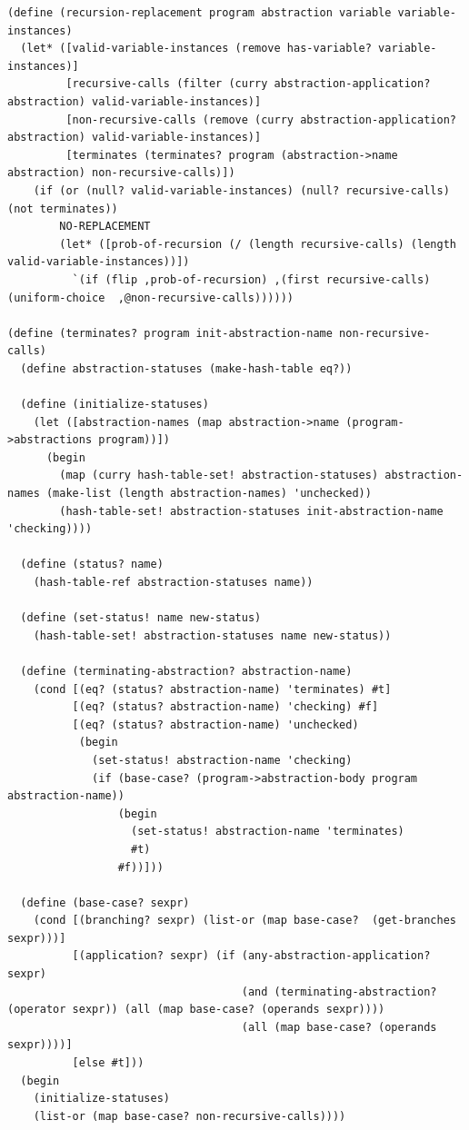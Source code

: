 \documentclass[a4paper,10pt]{article}
\begin{document}
\begin{lstlisting}[frame=trBL]
(define (recursion-replacement program abstraction variable variable-instances)
  (let* ([valid-variable-instances (remove has-variable? variable-instances)]
         [recursive-calls (filter (curry abstraction-application? abstraction) valid-variable-instances)]
         [non-recursive-calls (remove (curry abstraction-application? abstraction) valid-variable-instances)]
         [terminates (terminates? program (abstraction->name abstraction) non-recursive-calls)]) 
    (if (or (null? valid-variable-instances) (null? recursive-calls) (not terminates))
        NO-REPLACEMENT
        (let* ([prob-of-recursion (/ (length recursive-calls) (length valid-variable-instances))])
          `(if (flip ,prob-of-recursion) ,(first recursive-calls) (uniform-choice  ,@non-recursive-calls))))))

(define (terminates? program init-abstraction-name non-recursive-calls)
  (define abstraction-statuses (make-hash-table eq?))

  (define (initialize-statuses)
    (let ([abstraction-names (map abstraction->name (program->abstractions program))])
      (begin
        (map (curry hash-table-set! abstraction-statuses) abstraction-names (make-list (length abstraction-names) 'unchecked))
        (hash-table-set! abstraction-statuses init-abstraction-name 'checking))))

  (define (status? name)
    (hash-table-ref abstraction-statuses name))

  (define (set-status! name new-status)
    (hash-table-set! abstraction-statuses name new-status))
  
  (define (terminating-abstraction? abstraction-name)
    (cond [(eq? (status? abstraction-name) 'terminates) #t]
          [(eq? (status? abstraction-name) 'checking) #f]
          [(eq? (status? abstraction-name) 'unchecked)
           (begin
             (set-status! abstraction-name 'checking)
             (if (base-case? (program->abstraction-body program abstraction-name))
                 (begin
                   (set-status! abstraction-name 'terminates)
                   #t)
                 #f))]))
  
  (define (base-case? sexpr)
    (cond [(branching? sexpr) (list-or (map base-case?  (get-branches sexpr)))]
          [(application? sexpr) (if (any-abstraction-application? sexpr)
                                    (and (terminating-abstraction? (operator sexpr)) (all (map base-case? (operands sexpr))))
                                    (all (map base-case? (operands sexpr))))]
          [else #t]))
  (begin
    (initialize-statuses)
    (list-or (map base-case? non-recursive-calls))))
\end{lstlisting}
\end{document}
